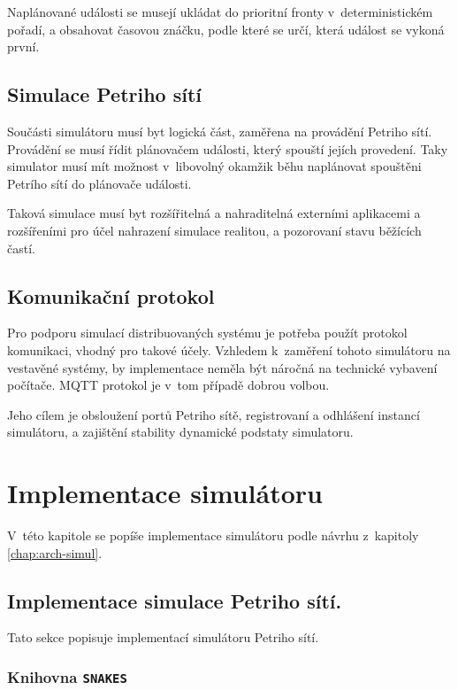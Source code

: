 Naplánované události se musejí ukládat do prioritní fronty v~deterministickém pořadí, a obsahovat časovou znáčku, podle které se určí, která událost se vykoná první.

\section{Simulace Petriho sítí}

Součásti simulátoru musí byt logická část, zaměřena na provádění Petriho sítí. Provádění se musí řídit plánovačem události, který spouští jejích provedení. Taky simulator musí mít možnost v~libovolný okamžik běhu naplánovat spouštěni Petrího sítí do plánovače události.

Taková simulace musí byt rozšířitelná a nahraditelná externími aplikacemi a rozšířeními pro účel nahrazení simulace realitou, a pozorovaní stavu běžících častí.

\section{Komunikační protokol}

Pro podporu simulací distribuovaných systému je potřeba použít protokol komunikaci, vhodný pro takové účely. Vzhledem k~zaměření tohoto simulátoru na vestavěné systémy, by implementace neměla být náročná na technické vybavení počítače. MQTT protokol je v~tom případě dobrou volbou.

Jeho cílem je obsloužení portů Petriho sítě, registrovaní a odhlášení instancí simulátoru, a zajištění stability dynamické podstaty simulatoru.

\chapter{Implementace simulátoru}
\label{chap:implementation}

V~této kapitole se popíše implementace simulátoru podle návrhu z~kapitoly \ref{chap:arch-simul}.

\section{Implementace simulace Petriho sítí.}
\label{sec:PNSim-impl}

Tato sekce popisuje implementací simulátoru Petriho sítí.

\subsection{Knihovna \texttt{SNAKES}}

